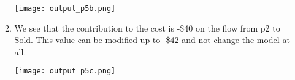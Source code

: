 \documentclass[11pt]{article}
\begin{document}
\begin{enumerate}
\begin{enumerate}
\texttt{[image: output\_p5b.png]}
\item We see that the contribution to the cost is -\$40 on the flow from p2 to Sold.  This value can be modified up to -\$42 and not change the model at all.  


\texttt{[image: output\_p5c.png]}
\end{enumerate}

\end{enumerate}
\end{document}
